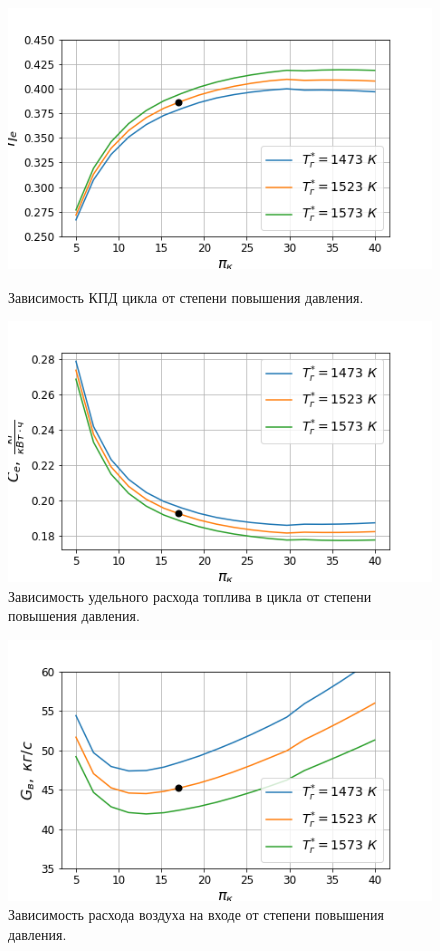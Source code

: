 \documentclass[a4paper,12pt]{article}
\begin{document}
    \begin{figure}[h!]
        \centering
        \includegraphics[scale=0.8]{../plots/cycle_eta_e.png}
        \caption{Зависимость КПД цикла от степени повышения давления.}
        \label{cycle_eta}

        \includegraphics[scale=0.8]{../plots/cycle_C_e.png}
        \caption{Зависимость удельного расхода топлива в цикла от степени повышения давления.}
        \label{cycle_C_e}
    \end{figure}

    \begin{figure}[h!]
        \centering
        \includegraphics[scale=0.8]{../plots/cycle_G_air.png}
        \caption{Зависимость расхода воздуха на входе от степени повышения давления.}
        \label{cycle_G_air}
    \end{figure}
\end{document}
